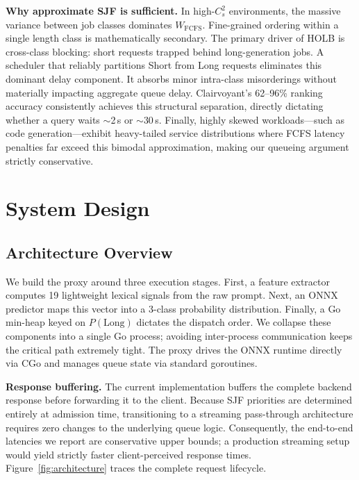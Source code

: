 \documentclass[10pt]{article}
\begin{document}
\textbf{Why approximate SJF is sufficient.} In high-$C_s^2$ environments, the massive variance between job classes dominates $W_{\text{FCFS}}$. Fine-grained ordering within a single length class is mathematically secondary. The primary driver of HOLB is cross-class blocking: short requests trapped behind long-generation jobs. A scheduler that reliably partitions Short from Long requests eliminates this dominant delay component. It absorbs minor intra-class misorderings without materially impacting aggregate queue delay. Clairvoyant's 62–96\% ranking accuracy consistently achieves this structural separation, directly dictating whether a query waits $\sim$2\,s or $\sim$30\,s. Finally, highly skewed workloads—such as code generation—exhibit heavy-tailed service distributions where FCFS latency penalties far exceed this bimodal approximation, making our queueing argument strictly conservative.

\section{System Design}
\label{sec:system}

\subsection{Architecture Overview}
\label{sec:arch}

We build the proxy around three execution stages. First, a feature extractor computes 19 lightweight lexical signals from the raw prompt. Next, an ONNX predictor maps this vector into a 3-class probability distribution. Finally, a Go min-heap keyed on $P(\text{Long})$ dictates the dispatch order. We collapse these components into a single Go process; avoiding inter-process communication keeps the critical path extremely tight. The proxy drives the ONNX runtime directly via CGo and manages queue state via standard goroutines.

\textbf{Response buffering.} The current implementation buffers the complete backend response before forwarding it to the client. Because SJF priorities are determined entirely at admission time, transitioning to a streaming pass-through architecture requires zero changes to the underlying queue logic. Consequently, the end-to-end latencies we report are conservative upper bounds; a production streaming setup would yield strictly faster client-perceived response times. Figure~\ref{fig:architecture} traces the complete request lifecycle.
\end{document}
